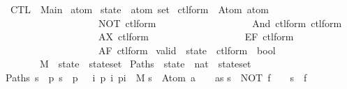 %
\begin{isabellebody}%
\def\isabellecontext{CTL}%
\ CTL\ {\isacharequal}\ Main{\isacharcolon}\isanewline
\isanewline
{}\ atom\isanewline
{}\ state\ {\isacharequal}\ {\isachardoublequote}atom\ set{\isachardoublequote}\isanewline
\isanewline
{}\ ctl{\isacharunderscore}form\ {\isacharequal}\ Atom\ atom\isanewline
\ \ \ \ \ \ \ \ \ \ \ \ \ \ \ \ \ \ {\isacharbar}\ NOT\ ctl{\isacharunderscore}form\isanewline
\ \ \ \ \ \ \ \ \ \ \ \ \ \ \ \ \ \ {\isacharbar}\ And\ ctl{\isacharunderscore}form\ ctl{\isacharunderscore}form\isanewline
\ \ \ \ \ \ \ \ \ \ \ \ \ \ \ \ \ \ {\isacharbar}\ AX\ ctl{\isacharunderscore}form\isanewline
\ \ \ \ \ \ \ \ \ \ \ \ \ \ \ \ \ \ {\isacharbar}\ EF\ ctl{\isacharunderscore}form\isanewline
\ \ \ \ \ \ \ \ \ \ \ \ \ \ \ \ \ \ {\isacharbar}\ AF\ ctl{\isacharunderscore}form\isanewline
\isanewline
{}\ valid\ {\isacharcolon}{\isacharcolon}\ {\isachardoublequote}state\ {\isasymRightarrow}\ ctl{\isacharunderscore}form\ {\isasymRightarrow}\ bool{\isachardoublequote}\ {\isacharparenleft}{\isachardoublequote}{\isacharparenleft}{\isacharunderscore}\ {\isasymTurnstile}\ {\isacharunderscore}{\isacharparenright}{\isachardoublequote}\ {\isacharbrackleft}\ \isanewline
\ \ \ \ \ \ \ M\ {\isacharcolon}{\isacharcolon}\ {\isachardoublequote}{\isacharparenleft}state\ {\isasymtimes}\ state{\isacharparenright}set{\isachardoublequote}\isanewline
\isanewline
{}\ Paths\ {\isacharcolon}{\isacharcolon}\ {\isachardoublequote}state\ {\isasymRightarrow}\ {\isacharparenleft}nat\ {\isasymRightarrow}\ state{\isacharparenright}set{\isachardoublequote}\isanewline
{\isachardoublequote}Paths\ s\ {\isasymequiv}\ {\isacharbraceleft}p{\isachardot}\ s\ {\isacharequal}\ p\ \ {\isasymand}\ {\isacharparenleft}{\isasymforall}i{\isachardot}\ {\isacharparenleft}p\ i{\isacharcomma}\ p{\isacharparenleft}i{\isacharplus}\ {\isasymin}\ M{\isacharparenright}{\isacharbraceright}{\isachardoublequote}\isanewline
\isanewline
{}\isanewline
{\isachardoublequote}s\ {\isasymTurnstile}\ Atom\ a\ \ {\isacharequal}\ \ {\isacharparenleft}a{\isasymin}s{\isacharparenright}{\isachardoublequote}\isanewline
{\isachardoublequote}s\ {\isasymTurnstile}\ NOT\ f\ \ \ {\isacharequal}\ {\isacharparenleft}{\isachartilde}{\isacharparenleft}s\ {\isasymTurnstile}\ f{\isacharparenright}{\isacharparenright}{\isachardoublequote}\isanewline

\end{isabellebody}
